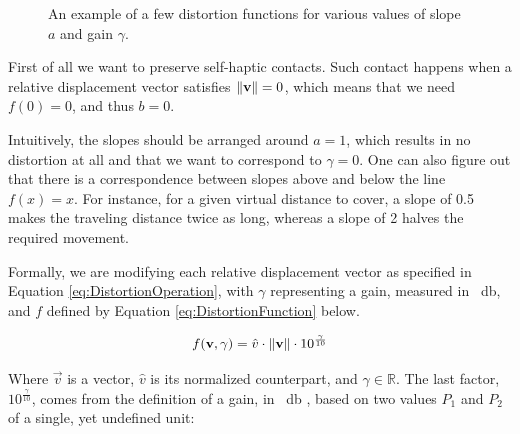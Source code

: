 \begin{figure}[h]
    \caption{An example of a few distortion functions for various values of slope $a$ and gain $\gamma $.}\label{fig:plotsOfGamma}
\end{figure}

First of all we want to preserve self-haptic contacts. Such contact happens when a relative displacement vector satisfies $\lVert\mathbf{v}\rVert = 0$, which means that we need $f(0) = 0$, and thus $b = 0$.

Intuitively, the slopes should be arranged around $a=1$, which results in no distortion at all and that we want to correspond to $\gamma = 0$. One can also figure out that there is a correspondence between slopes above and below the line $f(x) = x$. For instance, for a given virtual distance to cover, a slope of \num{0.5} makes the traveling distance twice as long, whereas a slope of \num{2} halves the required movement.

Formally, we are modifying each relative displacement vector as specified in Equation \ref{eq:DistortionOperation}, with $\gamma$ representing a gain, measured in \SI{}{\decibel}, and $f$ defined by Equation \ref{eq:DistortionFunction} below.

\begin{equation}
\label{eq:DistortionFunction}
f(\mathbf{v},\gamma ) = \hat{v} \cdot \lVert\mathbf{v}\rVert \cdot 10^{\frac{\gamma}{10}}
\end{equation}

Where $\vec{v}$ is a vector, $\hat{v}$ is its normalized counterpart, and $\gamma \in \mathbb{R}$. The last factor, $10^{\frac{\gamma}{10}}$, comes from the definition of a gain, in \SI{}{\decibel} \cite{book:decibel}, based on two values $P_1$ and $P_2$ of a single, yet undefined unit:

